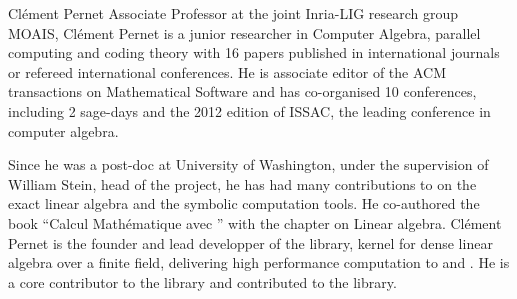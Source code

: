 \begin{participant}[type=leadPI,PM=12,salary=6500,gender=male]{Cl\'ement Pernet}
  Associate Professor at the joint Inria-LIG research group MOAIS, Cl\'ement Pernet is a
  junior researcher in Computer Algebra, parallel computing and coding theory with 16
  papers published in international journals or refereed international conferences. He is
  associate editor of the ACM transactions on Mathematical Software and has co-organised
  10 conferences, including 2 sage-days and the 2012 edition of ISSAC, the leading
  conference in computer algebra.

  Since he was a post-doc at University of Washington, under the supervision of William
  Stein, head of the \Sage project, he has had many contributions to \Sage on the exact
  linear algebra and the symbolic computation tools. He co-authored the book ``Calcul
  Mathématique avec \Sage'' with the chapter on Linear algebra.  Cl\'ement Pernet is the
  founder and lead developper of the  library, kernel for dense linear algebra
  over a finite field, delivering high performance computation to \Linbox and \Sage. He is a
  core contributor to the \Linbox library and contributed to the  library.






\end{participant}
